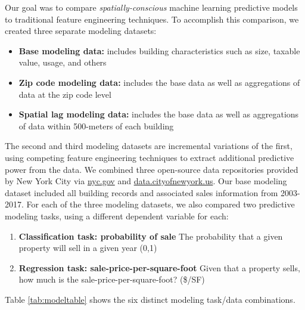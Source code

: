 \documentclass[conference,final,]{IEEEtran}
\providecommand{\tightlist}{%
  \setlength{\itemsep}{0pt}\setlength{\parskip}{0pt}}
\begin{document}
Our goal was to compare \emph{spatially-conscious} machine learning
predictive models to traditional feature engineering techniques. To
accomplish this comparison, we created three separate modeling datasets:

\begin{itemize}
\tightlist
\item
  \textbf{Base modeling data:} includes building characteristics such as
  size, taxable value, usage, and others
\item
  \textbf{Zip code modeling data:} includes the base data as well as
  aggregations of data at the zip code level
\item
  \textbf{Spatial lag modeling data:} includes the base data as well as
  aggregations of data within 500-meters of each building
\end{itemize}

\noindent The second and third modeling datasets are incremental
variations of the first, using competing feature engineering techniques
to extract additional predictive power from the data. We combined three
open-source data repositories provided by New York City via
\url{nyc.gov} and \url{data.cityofnewyork.us}. Our base modeling dataset
included all building records and associated sales information from
2003-2017. For each of the three modeling datasets, we also compared two
predictive modeling tasks, using a different dependent variable for
each:

\begin{enumerate}
\def\labelenumi{\arabic{enumi})}
\tightlist
\item
  \textbf{Classification task: probability of sale} The probability that
  a given property will sell in a given year (0,1)
\item
  \textbf{Regression task: sale-price-per-square-foot} Given that a
  property sells, how much is the sale-price-per-square-foot? (\$/SF)
\end{enumerate}

\noindent Table \ref{tab:modeltable} shows the six distinct modeling
task/data combinations.
\end{document}
